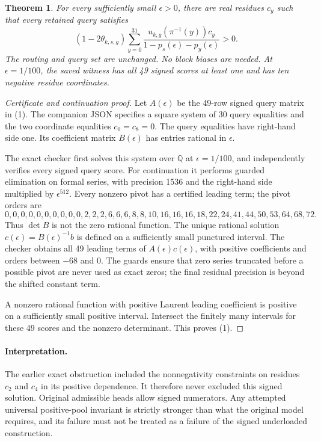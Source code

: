 \documentclass[11pt]{article}
\newtheorem{theorem}{Theorem}
\begin{document}
\begin{theorem}
For every sufficiently small $\epsilon>0$, there are real residues
$c_y$ such that every retained query satisfies
\[
 (1-2\theta_{k,s,g})
 \sum_{y=0}^{31}\frac{u_{k,g}(\pi^{-1}(y))c_y}
 {1-p_s(\epsilon)-p_y(\epsilon)}>0.
 \tag{1}
\]
The routing and query set are unchanged. No block biases are needed.
At $\epsilon=1/100$, the saved witness has all 49 signed scores at
least one and has ten negative residue coordinates.
\end{theorem}
\begin{proof}[Certificate and continuation proof]
Let $A(\epsilon)$ be the 49-row signed query matrix in (1).
The companion JSON specifies a square system of 30 query equalities
and the two coordinate equalities $c_0=c_8=0$. The query equalities
have right-hand side one. Its coefficient matrix $B(\epsilon)$ has
entries rational in $\epsilon$.

The exact checker first solves this system over $\mathbb Q$ at
$\epsilon=1/100$, and independently verifies every signed query score.
For continuation it performs guarded elimination on formal series,
with precision 1536 and the right-hand side multiplied by
$\epsilon^{512}$. Every nonzero pivot has a certified leading term;
the pivot orders are
\[
 0,0,0,0,0,0,0,0,0,0,2,2,2,6,6,6,
 8,8,10,16,16,16,18,22,24,41,44,50,53,64,68,72.
\]
Thus $\det B$ is not the zero rational function. The unique rational
solution $c(\epsilon)=B(\epsilon)^{-1}b$ is defined on a sufficiently
small punctured interval. The checker obtains all 49 leading terms
of $A(\epsilon)c(\epsilon)$, with positive coefficients and orders
between $-68$ and $0$. The guards ensure that zero series truncated
before a possible pivot are never used as exact zeros; the final
residual precision is beyond the shifted constant term.

A nonzero rational function with positive Laurent leading coefficient
is positive on a sufficiently small positive interval. Intersect the
finitely many intervals for these 49 scores and the nonzero determinant.
This proves (1).
\end{proof}

\paragraph{Interpretation.}
The earlier exact obstruction included the nonnegativity constraints
on residues $c_2$ and $c_4$ in its positive dependence. It therefore
never excluded this signed solution. Original admissible heads allow
signed numerators. Any attempted universal positive-pool invariant is
strictly stronger than what the original model requires, and its
failure must not be treated as a failure of the signed underloaded
construction.
\end{document}
